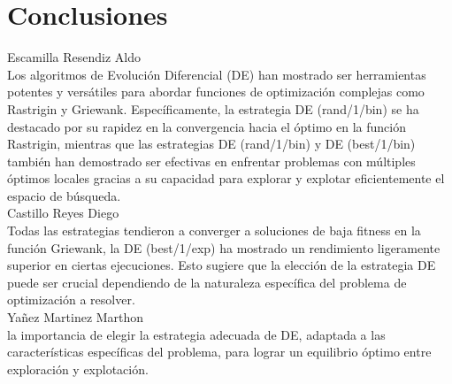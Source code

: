\documentclass{report}
\begin{document}
\section{Conclusiones}

Escamilla Resendiz Aldo\\
Los algoritmos de Evolución Diferencial (DE) han mostrado ser herramientas potentes y versátiles para abordar funciones de optimización complejas como Rastrigin y Griewank. Específicamente, la estrategia DE (rand/1/bin) se ha destacado por su rapidez en la convergencia hacia el óptimo en la función Rastrigin, mientras que las estrategias DE (rand/1/bin) y DE (best/1/bin) también han demostrado ser efectivas en enfrentar problemas con múltiples óptimos locales gracias a su capacidad para explorar y explotar eficientemente el espacio de búsqueda.\\
Castillo Reyes Diego\\
Todas las estrategias tendieron a converger a soluciones de baja fitness en la función Griewank, la DE (best/1/exp) ha mostrado un rendimiento ligeramente superior en ciertas ejecuciones. Esto sugiere que la elección de la estrategia DE puede ser crucial dependiendo de la naturaleza específica del problema de optimización a resolver.\\
Yañez Martinez Marthon\\
la importancia de elegir la estrategia adecuada de DE, adaptada a las características específicas del problema, para lograr un equilibrio óptimo entre exploración y explotación.
\end{document}
